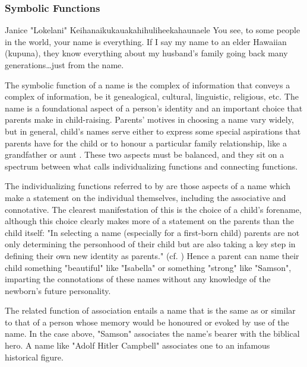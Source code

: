 \subsubsection{Symbolic Functions}

\begin{aquote}{Janice "Lokelani" Keihanaikukauakahihuliheekahaunaele
	\parencite{lee-valley}}
	You see, to some people in the world, your name is everything. If I say my
	name to an elder Hawaiian (kupuna), they know everything about my husband's
	family going back many generations…just from the name.
\end{aquote}

The symbolic function of a name is the complex of information that conveys a
complex of information, be it genealogical, cultural, linguistic, religious,
etc. The name is a foundational aspect of a person's identity and an important
choice that parents make in child-raising. Parents' motives in choosing a name
vary widely, but in general, child's names serve either to express some special
aspirations that parents have for the child or to honour a particular family
relationship, like a grandfather or aunt \parencite{finch08}. These two aspects
must be balanced, and they sit on a spectrum between what \textcite{finch08}
calls individualizing functions and connecting functions.

The individualizing functions referred to by \textcite{finch08} are those
aspects of a name which make a statement on the individual themselves,
including the associative and connotative. The clearest manifestation of this
is the choice of a child's forename, although this choice clearly makes more of
a statement on the parents than the child itself: "In selecting a name
(especially for a first-born child) parents are not only determining the
personhood of their child but are also taking a key step in defining their own
new identity as parents." \parencite[718]{finch08} (cf.
\parencite[399]{heymann11}) Hence a parent can name their child something
"beautiful" like "Isabella" or something "strong" like "Samson", imparting the
connotations of these names without any knowledge of the newborn's future
personality.

The related function of association entails a name that is the same as or
similar to that of a person whose memory would be honoured or evoked by use of
the name. In the case above, "Samson" associates the name's bearer with the
biblical hero. A name like "Adolf Hitler Campbell" associates one to an
infamous historical figure. 


